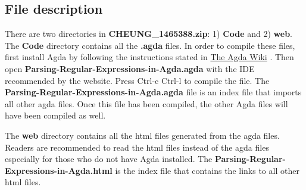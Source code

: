 \documentclass[twoside,openright,final]{bhamthesis}
\begin{document}
\tableofcontents















\newpage
\nocite{*}




\begin{appendices}
\chapter{File description}

\par There are two directories in \textbf{CHEUNG\_1465388.zip}: 1) \textbf{Code} and 2)
\textbf{web}. The \textbf{Code} directory contains all the
\textbf{.agda} files. In order to compile these files, first install
Agda by following the instructions stated in
\href{http://wiki.portal.chalmers.se/agda/pmwiki.php?n=Main.Download}{The
Agda Wiki} \cite{agdawiki2016}. Then open
\textbf{Parsing-Regular-Expressions-in-Agda.agda} with the IDE
recommended by the website. Press Ctrl-c Ctrl-l to compile the
file. The \textbf{Parsing-Regular-Expressions-in-Agda.agda} file is an
index file that imports all other agda files. Once this file has been
compiled, the other Agda files will have been compiled as well. 
\par The \textbf{web} directory contains all the html files generated
from the agda files. Readers are recommended to read the html files
instead of the agda files especially for those who do not have Agda
installed. The \textbf{Parsing-Regular-Expressions-in-Agda.html} is
the index file that contains the links to all other html files. 
\end{appendices}
\end{document}
